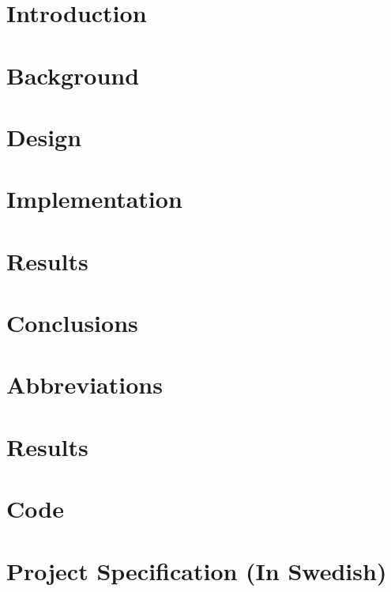 \documentclass[12pt,twoside]{Classfiles/kau_report}
\begin{document}
\section{Introduction}
\label{sec:intro}

\cleardoublepage

\section{Background}
\label{sec:back}

\cleardoublepage

\section{Design}
\label{sec:design}

\cleardoublepage

\section{Implementation}
\label{sec:impl}

\cleardoublepage

\section{Results}
\label{sec:result}

\cleardoublepage

\section{Conclusions}
\label{sec:concl}

\cleardoublepage

\nocite{*}

\begin{singlespace}


\end{singlespace}
\cleardoublepage

\appendix
\section{Abbreviations}
\label{app:abbr}

\cleardoublepage

\section{Results}
\label{app:results}

\cleardoublepage

\section{Code}
\label{app:code}

\cleardoublepage

\section{Project Specification (In Swedish)}
\label{app:projectspec}

\end{document}
